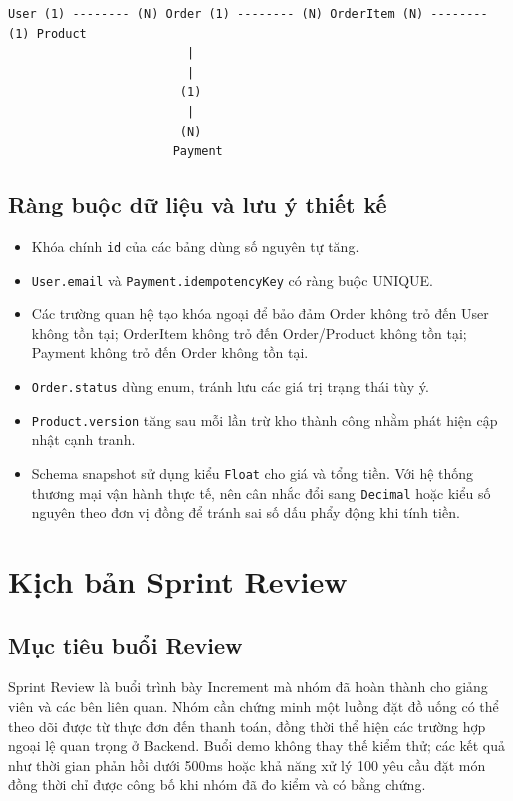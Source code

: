 \begin{verbatim}
User (1) -------- (N) Order (1) -------- (N) OrderItem (N) -------- (1) Product
                         |
                         |
                        (1)
                         |
                        (N)
                       Payment
\end{verbatim}

\subsection{Ràng buộc dữ liệu và lưu ý thiết kế}

\begin{itemize}
    \item Khóa chính \texttt{id} của các bảng dùng số nguyên tự tăng.
    \item \texttt{User.email} và \texttt{Payment.idempotencyKey} có ràng buộc UNIQUE.
    \item Các trường quan hệ tạo khóa ngoại để bảo đảm Order không trỏ đến User không tồn tại; OrderItem không trỏ đến Order/Product không tồn tại; Payment không trỏ đến Order không tồn tại.
    \item \texttt{Order.status} dùng enum, tránh lưu các giá trị trạng thái tùy ý.
    \item \texttt{Product.version} tăng sau mỗi lần trừ kho thành công nhằm phát hiện cập nhật cạnh tranh.
    \item Schema snapshot sử dụng kiểu \texttt{Float} cho giá và tổng tiền. Với hệ thống thương mại vận hành thực tế, nên cân nhắc đổi sang \texttt{Decimal} hoặc kiểu số nguyên theo đơn vị đồng để tránh sai số dấu phẩy động khi tính tiền.
\end{itemize}

\section{Kịch bản Sprint Review}
\label{sec:sprint-review}

\subsection{Mục tiêu buổi Review}

Sprint Review là buổi trình bày Increment mà nhóm đã hoàn thành cho giảng viên và các bên liên quan. Nhóm cần chứng minh một luồng đặt đồ uống có thể theo dõi được từ thực đơn đến thanh toán, đồng thời thể hiện các trường hợp ngoại lệ quan trọng ở Backend. Buổi demo không thay thế kiểm thử; các kết quả như thời gian phản hồi dưới 500ms hoặc khả năng xử lý 100 yêu cầu đặt món đồng thời chỉ được công bố khi nhóm đã đo kiểm và có bằng chứng.

